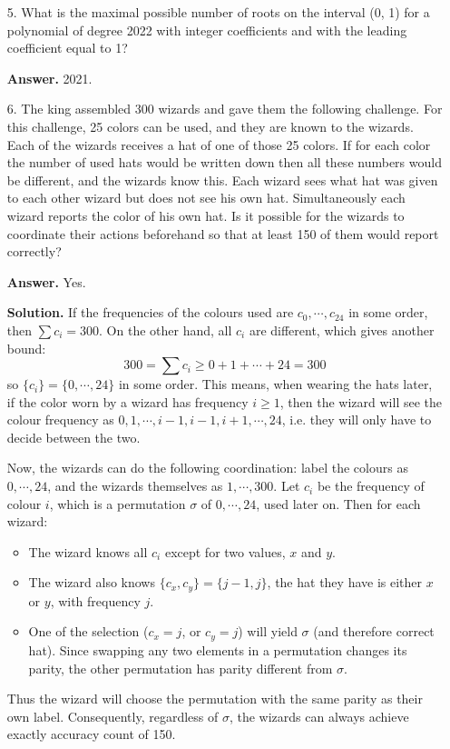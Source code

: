 \documentclass[11pt,a4paper]{article}
\begin{document}
\begin{enumerate}
        \item [5.] 
        What is the maximal possible number of roots on the interval (0, 1) for a polynomial of
        degree 2022 with integer coefficients and with the leading coefficient equal to 1?
        
        \textbf{Answer.} 2021. 
        
        \item [6.]
        The king assembled 300 wizards and gave them the following challenge. For this challenge,
        25 colors can be used, and they are known to the wizards. Each of the wizards receives a
        hat of one of those 25 colors. If for each color the number of used hats would be written
        down then all these numbers would be different, and the wizards know this. Each wizard
        sees what hat was given to each other wizard but does not see his own hat. Simultaneously
        each wizard reports the color of his own hat. Is it possible for the wizards to coordinate
        their actions beforehand so that at least 150 of them would report correctly?
        
        \textbf{Answer.} Yes. 
        
        \textbf{Solution.} 
        If the frequencies of the colours used are $c_0, \cdots, c_{24}$ in some order, 
        then $\sum c_i = 300$. On the other hand, all $c_i$ are different, which gives another bound: 
        \[
        300= \sum c_i \ge 0 + 1 + \cdots + 24 = 300
        \]
        so $\{c_i\}=\{0, \cdots, 24\}$ in some order. 
        This means, when wearing the hats later, if the color worn by a wizard has frequency $i\ge 1$, 
        then the wizard will see the colour frequency as $0, 1, \cdots, i-1, i-1, i+1, \cdots, 24$, 
        i.e. they will only have to decide between the two. 
        
        Now, the wizards can do the following coordination: 
        label the colours as $0, \cdots, 24$, and the wizards themselves as $1, \cdots, 300$. 
        Let $c_i$ be the frequency of colour $i$, which is a permutation $\sigma$ of $0, \cdots, 24$, used later on. 
        Then for each wizard: 
        \begin{itemize}
        	\item The wizard knows all $c_i$ except for two values, $x$ and $y$. 
        	
        	\item The wizard also knows $\{c_x, c_y\}=\{j-1, j\}$, the hat they have is either $x$ or $y$, 
        	with frequency $j$. 
        	
        	\item One of the selection ($c_x=j$, or $c_y=j$) will yield $\sigma$ (and therefore correct hat). Since swapping any two elements in a permutation changes its parity, 
        	the other permutation has parity different from $\sigma$. 
        \end{itemize}
        Thus the wizard will choose the permutation with the same parity as their own label. 
        Consequently, regardless of $\sigma$, the wizards can always achieve exactly accuracy count of 150. 
        
	\end{enumerate}
\end{document}
